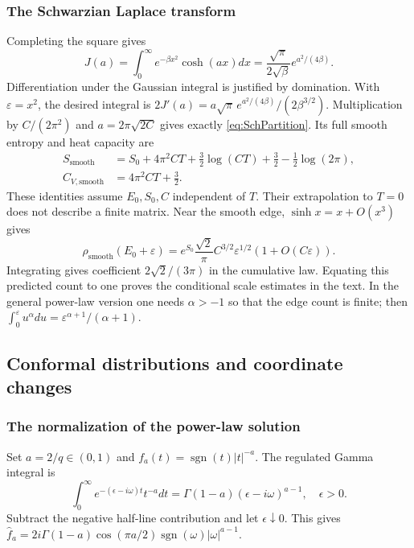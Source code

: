 \documentclass[11pt]{article}
\numberwithin{equation}{section}
\theoremstyle{exposition}
\theoremstyle{result}
\newcommand{\sgn}{\operatorname{sgn}}
\begin{document}
\subsubsection{The Schwarzian Laplace transform}
Completing the square gives
\begin{equation*}
J(a)=\int_0^\infty e^{-\beta x^2}\cosh(ax)dx
=\frac{\sqrt\pi}{2\sqrt\beta}e^{a^2/(4\beta)}.
\end{equation*}
Differentiation under the Gaussian integral is justified by domination. With $\varepsilon=x^2$, the desired integral is $2J'(a)=a\sqrt\pi\,e^{a^2/(4\beta)}/(2\beta^{3/2})$. Multiplication by $C/(2\pi^2)$ and $a=2\pi\sqrt{2C}$ gives exactly \eqref{eq:SchPartition}. Its full smooth entropy and heat capacity are
\begin{align*}
S_{\mathrm{smooth}}&=S_0+4\pi^2CT+\tfrac32\log(CT)+\tfrac32-\tfrac12\log(2\pi),\\
C_{V,\mathrm{smooth}}&=4\pi^2CT+\tfrac32.
\end{align*}
These identities assume $E_0,S_0,C$ independent of $T$. Their extrapolation to $T=0$ does not describe a finite matrix. Near the smooth edge, $\sinh x=x+O(x^3)$ gives
\begin{equation*}
\rho_{\mathrm{smooth}}(E_0+\varepsilon)
=e^{S_0}\frac{\sqrt2}{\pi}C^{3/2}\varepsilon^{1/2}(1+O(C\varepsilon)).
\end{equation*}
Integrating gives coefficient $2\sqrt2/(3\pi)$ in the cumulative law. Equating this predicted count to one proves the conditional scale estimates in the text. In the general power-law version one needs $\alpha>-1$ so that the edge count is finite; then $\int_0^\varepsilon u^\alpha du=\varepsilon^{\alpha+1}/(\alpha+1)$.

\subsection{Conformal distributions and coordinate changes}\label{app:conformalDetails}

\subsubsection{The normalization of the power-law solution}
Set $a=2/q\in(0,1)$ and $f_a(t)=\sgn(t)|t|^{-a}$. The regulated Gamma integral is
\begin{equation*}
\int_0^\infty e^{-(\epsilon-i\omega)t}t^{-a}dt
=\Gamma(1-a)(\epsilon-i\omega)^{a-1},\quad \epsilon>0.
\end{equation*}
Subtract the negative half-line contribution and let $\epsilon\downarrow0$. This gives $\widehat f_a=2i\Gamma(1-a)\cos(\pi a/2)\sgn(\omega)|\omega|^{a-1}$.
\end{document}
